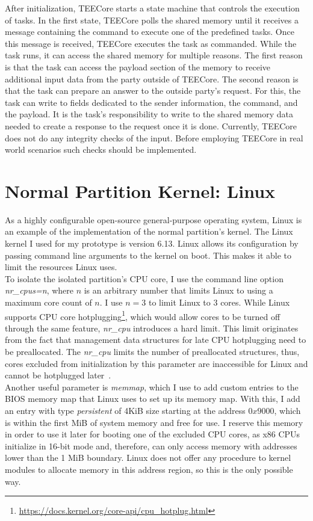 After initialization, TEECore starts a state machine that
controls the execution of tasks. In the first state, TEECore polls the
shared memory until it receives a message containing the command to execute one
of the predefined tasks. Once this message is received, TEECore executes
the task as commanded. While the task runs, it can access the shared memory for
multiple reasons. The first reason is that the task can access the payload
section of the memory to receive additional input data from the party outside of
TEECore. The second reason is that the task can prepare an answer to the
outside party's request. For this, the task can write to fields dedicated to the
sender information, the command, and the payload. It is the task's
responsibility to write to the shared memory data needed to create a response to
the request once it is done. Currently, TEECore does not do any integrity checks
of the input. Before employing TEECore in real world scenarios such checks
should be implemented.

\section{Normal Partition Kernel: Linux}
\label{sec:implementation:hostKernel}
As a highly configurable open-source general-purpose operating system, Linux is
an example of the implementation of the normal partition's kernel. The Linux
kernel I used for my prototype is version 6.13. Linux allows its configuration
by passing command line arguments to the kernel on boot. This makes it able to
limit the resources Linux uses. \\

To isolate the isolated partition's CPU core, I use the command line option
\textit{nr\_cpus=n}, where $n$ is an arbitrary number that limits Linux to using
a maximum core count of $n$. I use $n=3$ to limit Linux to 3 cores. While Linux
supports CPU core
hotplugging\footnote{\url{https://docs.kernel.org/core-api/cpu_hotplug.html}},
which would allow cores to be turned off through the same feature,
\textit{nr\_cpu} introduces a hard limit. This limit originates from the fact
that management data structures for late CPU hotplugging need to be
preallocated. The \textit{nr\_cpu} limits the number of preallocated structures,
thus, cores excluded from initialization by this parameter are inaccessible for
Linux and cannot be hotplugged later~\cite{kernel-parameters}. \\

Another useful parameter is \textit{memmap}, which I use to add custom entries
to the BIOS memory map that Linux uses to set up its memory map. With this, I
add an entry with type \textit{persistent} of 4KiB size starting at the address
$0x9000$, which is within the first MiB of system memory and free for use. I
reserve this memory in order to use it later for booting one of the excluded
CPU cores, as x86 CPUs initialize in 16-bit mode and, therefore, can only access
memory with addresses lower than the 1 MiB boundary. Linux does not offer any
procedure to kernel modules to allocate memory in this address region, so this
is the only possible way.\\


